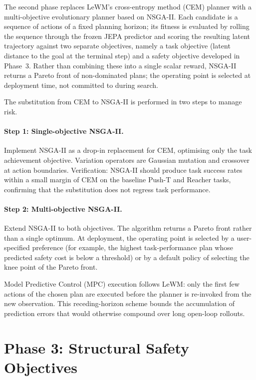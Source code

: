 \documentclass[a4paper,twoside,12pt]{report}
\begin{document}
The second phase replaces LeWM's cross-entropy method (CEM) planner with a multi-objective evolutionary planner based on NSGA-II. Each candidate is a sequence of actions of a fixed planning horizon; its fitness is evaluated by rolling the sequence through the frozen JEPA predictor and scoring the resulting latent trajectory against two separate objectives, namely a task objective (latent distance to the goal at the terminal step) and a safety objective developed in Phase~3. Rather than combining these into a single scalar reward, NSGA-II returns a Pareto front of non-dominated plans; the operating point is selected at deployment time, not committed to during search.

The substitution from CEM to NSGA-II is performed in two steps to manage risk.

\paragraph{Step 1: Single-objective NSGA-II.} Implement NSGA-II as a drop-in replacement for CEM, optimising only the task achievement objective. Variation operators are Gaussian mutation and crossover at action boundaries. Verification: NSGA-II should produce task success rates within a small margin of CEM on the baseline Push-T and Reacher tasks, confirming that the substitution does not regress task performance.

\paragraph{Step 2: Multi-objective NSGA-II.} Extend NSGA-II to both objectives. The algorithm returns a Pareto front rather than a single optimum. At deployment, the operating point is selected by a user-specified preference (for example, the highest task-performance plan whose predicted safety cost is below a threshold) or by a default policy of selecting the knee point of the Pareto front.

Model Predictive Control (MPC) execution follows LeWM: only the first few actions of the chosen plan are executed before the planner is re-invoked from the new observation. This receding-horizon scheme bounds the accumulation of prediction errors that would otherwise compound over long open-loop rollouts.

\section{Phase 3: Structural Safety Objectives}
\end{document}
